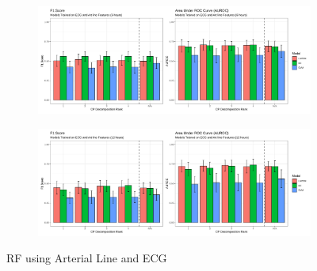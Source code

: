 \begin{figure}[htb]
    \centering
    \begin{subfigure}[htb]{0.49\textwidth}
        \includegraphics[width=\textwidth]{body/figures/both_6.svg}
    \end{subfigure}
    \hfill
    \begin{subfigure}[htb]{0.49\textwidth}
        \includegraphics[width=\textwidth]{body/figures/both_12.svg}
    \end{subfigure}
    \caption{RF using Arterial Line and ECG}
    \label{fig:rf_sigonly}
\end{figure}  %

